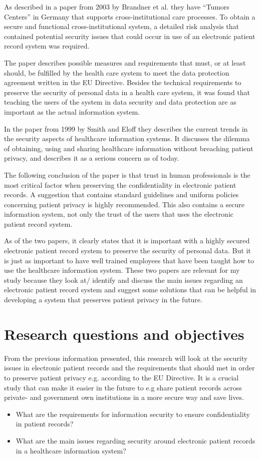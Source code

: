 \documentclass[11pt, a4paper]{article}
\begin{document}
As described in a paper from 2003 by Brandner et al.\cite{van2003data} they have “Tumors Centers” in Germany that supports cross-institutional care processes. To obtain a secure and functional cross-institutional system, a detailed risk analysis that contained potential security issues that could occur in use of an electronic patient record system was required.

The paper describes possible measures and requirements that must, or at least should, be fulfilled by the health care system to meet the data protection agreement written in the EU Directive. Besides the technical requirements to preserve the security of personal data in a health care system, it was found that teaching the users of the system in data security and data protection are as important as the actual information system.

In the paper from 1999 by Smith and Eloff\cite{Smith199939} they describes the current trends in the security aspects of healthcare information systems. It discusses the dilemma of obtaining, using and sharing healthcare information without breaching patient privacy, and describes it as a serious concern as of today. 

The following conclusion of the paper is that trust in human professionals is the most critical factor when preserving the confidentiality in electronic patient records. A suggestion that contains standard guidelines and uniform policies concerning patient privacy is highly recommended. This also contains a secure information system, not only the trust of the users that uses the electronic patient record system.  

As of the two papers, it clearly states that it is important with a highly secured electronic patient record system to preserve the security of personal data. But it is just as important to have well trained employees that have been taught how to use the healthcare information system. These two papers are relevant for my study because they look at/ identify and discuss the main issues regarding an electronic patient record system and suggest some solutions that can be helpful in developing a system that preserves patient privacy in the future.

\section{Research questions and objectives}

From the previous information presented, this research will look at the security issues in electronic patient records and the requirements that should met in order to preserve patient privacy e.g. according to the EU Directive. It is a crucial study that can make it easier in the future to e.g share patient records across private- and government own institutions in a more secure way and save lives.   

\begin{itemize}
\item What are the requirements for information security to ensure confidentiality in patient records?
\item What are the main issues regarding security around electronic patient records in a healthcare information system?
\end{itemize}


\end{document}
